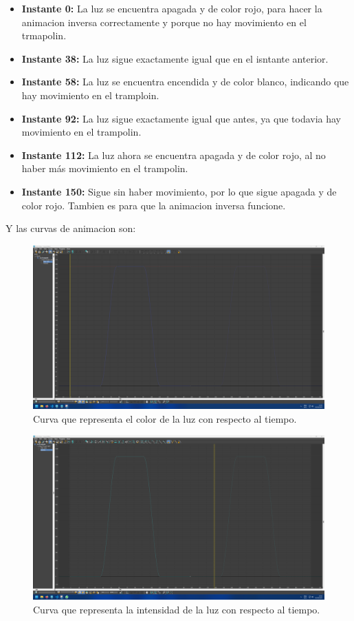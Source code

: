 \documentclass{article}
\begin{document}
\begin{itemize}
    \item \textbf{Instante 0: }La luz se encuentra apagada y de color rojo, para hacer la animacion inversa correctamente y porque no hay movimiento en el trmapolin.
    \item \textbf{Instante 38: }La luz sigue exactamente igual que en el isntante anterior.
    \item \textbf{Instante 58: }La luz se encuentra encendida y de color blanco, indicando que hay movimiento en el tramploin.
    \item \textbf{Instante 92: }La luz sigue exactamente igual que antes, ya que todavia hay movimiento en el trampolin.
    \item \textbf{Instante 112: }La luz ahora se encuentra apagada y de color rojo, al no haber más movimiento en el trampolin.
    \item \textbf{Instante 150: }Sigue sin haber movimiento, por lo que sigue apagada y de color rojo. Tambien es para que la animacion inversa funcione.
\end{itemize}

Y las curvas de animacion son:

\begin{figure}[H]
    \centering
    \includegraphics[width=\textwidth]{imagenes/curvas/LC/filter.png}
    \caption{Curva que representa el color de la luz con respecto al tiempo.}
 \end{figure}

 \begin{figure}[H]
    \centering
    \includegraphics[width=\textwidth]{imagenes/curvas/LC/intensity.png}
    \caption{Curva que representa la intensidad de la luz con respecto al tiempo.}
 \end{figure}
\end{document}
